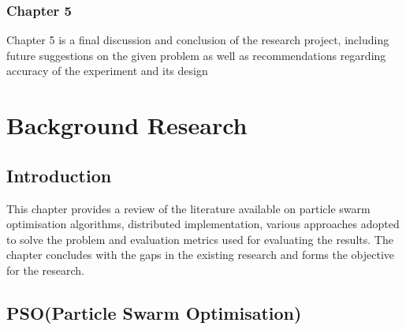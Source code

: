 \documentclass[oneside,12pt]{book}
\begin{document}
\subsection{Chapter 5}
Chapter 5 is a final discussion and conclusion of the research project, including future suggestions on the given problem as well as recommendations regarding accuracy of the experiment and its design

\chapter{Background Research}
\section{Introduction}
This  chapter  provides  a  review of the  literature available on particle swarm optimisation algorithms, distributed implementation, various  approaches adopted  to  solve  the  problem  and  evaluation metrics used  for  evaluating  the results.  The  chapter  concludes with  the  gaps  in  the existing research and forms the objective for the research.
\section{PSO(Particle Swarm Optimisation)}
\end{document}
